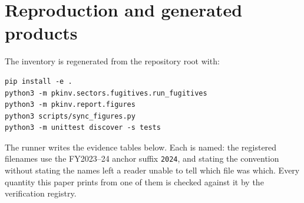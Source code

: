\section{Reproduction and generated products}
\label{app:repro}

The inventory is regenerated from the repository root with:

\begin{verbatim}
pip install -e .
python3 -m pkinv.sectors.fugitives.run_fugitives
python3 -m pkinv.report.figures
python3 scripts/sync_figures.py
python3 -m unittest discover -s tests
\end{verbatim}

The runner writes the evidence tables below. Each is named: the registered filenames use the
FY2023--24 anchor suffix \texttt{2024}, and stating the convention without stating the names
left a reader unable to tell which file was which. Every quantity this paper prints from one of
them is checked against it by the verification registry.

